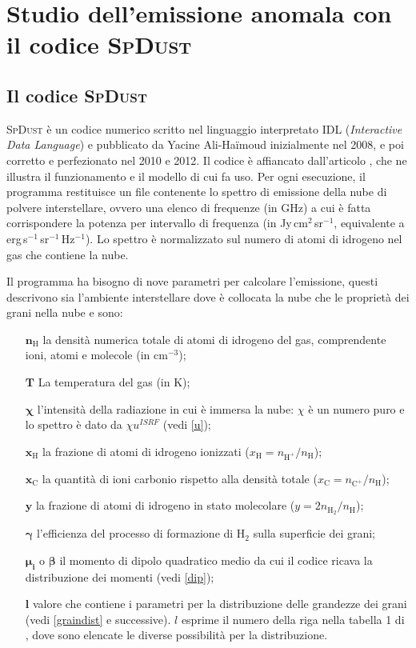 \chapter{Studio dell'emissione anomala con il codice \textsc{SpDust}}

\section{Il codice \textsc{SpDust}}

\textsc{SpDust} è un codice numerico scritto nel linguaggio interpretato IDL (\textit{Interactive Data Language}) e pubblicato da Yacine Ali-Haïmoud inizialmente nel 2008, e poi corretto e perfezionato nel 2010 e 2012. Il codice è affiancato dall'articolo \textcite{Ali}, che ne illustra il funzionamento e il modello di cui fa uso.
Per ogni esecuzione, il programma restituisce un file contenente lo spettro di emissione della nube di polvere interstellare, ovvero una elenco di frequenze (in GHz) a cui è fatta corrispondere la potenza per intervallo di frequenza (in Jy\,cm$^2$\,sr$^{-1}$, equivalente a erg\,s$^{-1}$\,sr$^{-1}$\,Hz$^{-1}$). Lo spettro è normalizzato sul numero di atomi di idrogeno nel gas che contiene la nube.

Il programma ha bisogno di nove parametri per calcolare l'emissione, questi descrivono sia l'ambiente interstellare dove è collocata la nube che le proprietà dei grani nella nube e sono:
\begin{enumerate}
	\item[$\boldsymbol{n_{\mathrm{H}}}$] la densità numerica totale di atomi di idrogeno del gas, comprendente ioni, atomi e molecole (in cm$^{-3}$);
	\item[$\boldsymbol{T}$] La temperatura del gas (in K);
	\item[$\boldsymbol{\chi}$] l'intensità della radiazione in cui è immersa la nube: $\chi$ è un numero puro e lo spettro è dato  da $\chi u^{ISRF}$ (vedi \ref{u});
	\item[$\boldsymbol{x_{\mathrm{H}}}$] la frazione di atomi di idrogeno ionizzati ($x_{\mathrm{H}} = n_{\mathrm{H}^+}/n_{\mathrm{H}}$);
	\item[$\boldsymbol{x_{\mathrm{C}}}$] la quantità di ioni carbonio rispetto alla densità totale ($x_{\mathrm{C}} = n_{\mathrm{C}^+}/n_{\mathrm{H}}$);
	\item[$\boldsymbol{y}$] la frazione di atomi di idrogeno in stato molecolare ($y = 2n_{\mathrm{H_2}}/n_{\mathrm{H}}$);
	\item[$\boldsymbol{\gamma}$] l'efficienza del processo di formazione di H$_2$ sulla superficie dei grani;
	\item[$\boldsymbol{\mu_i}$ o $\boldsymbol{\beta}$] il momento di dipolo quadratico medio da cui il codice ricava la distribuzione dei momenti (vedi \ref{dip});
	\item[$\boldsymbol{l}$] valore che contiene i parametri per la distribuzione delle grandezze dei grani (vedi \ref{graindist} e successive). $l$ esprime il numero della riga nella tabella 1 di \textcite{WD01a}, dove sono elencate le diverse possibilità per la distribuzione.
	\end{enumerate}
	
